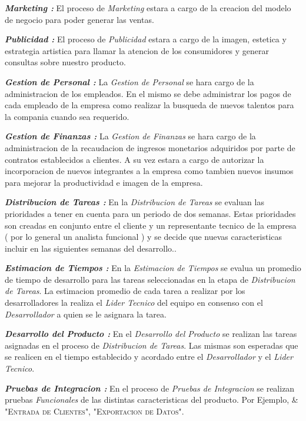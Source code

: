 \documentclass[
10pt, %
a4paper, %
oneside, %
headinclude,footinclude, %
BCOR5mm, %
]{scrartcl}
\begin{document}
  \textbf{ \emph{Marketing : } } El proceso de \textit{Marketing} estara
  a cargo de la creacion del modelo de negocio para poder generar las ventas.

  \textbf{ \emph{Publicidad : } } El proceso de \textit{Publicidad} estara
  a cargo de la imagen, estetica y estrategia artistica para llamar la atencion
  de los consumidores y generar consultas sobre nuestro producto.

  \textbf{ \emph{Gestion de Personal : } } La \textit{Gestion de Personal}
  se hara cargo de la administracion de los empleados. En el mismo se debe
  administrar los pagos de cada empleado de la empresa como realizar la busqueda
  de nuevos talentos para la compania cuando sea requerido.

  \textbf{ \emph{Gestion de Finanzas : } } La \textit{Gestion  de Finanzas} se
   hara cargo de la administracion de la recaudacion de ingresos monetarios
   adquiridos por parte de contratos establecidos a clientes. A su vez
   estara a cargo de autorizar la incorporacion de nuevos integrantes a la
   empresa como tambien nuevos insumos para mejorar la productividad e
   imagen de la empresa.

  \textbf{ \emph{Distribucion de Tareas : } } En la \textit{Distribucion de Tareas}
  se evaluan las prioridades a tener en cuenta para un periodo de dos semanas.
  Estas prioridades son creadas en conjunto entre el cliente y un representante
  tecnico de la empresa ( por lo general un analista funcional ) y se decide
  que nuevas caracteristicas incluir en las siguientes semanas del desarrollo..

  \textbf{ \emph{Estimacion de Tiempos : } } En la \textit{Estimacion de Tiempos}
  se evalua un promedio de tiempo de desarrollo  para las tareas seleccionadas
  en la etapa de \textit{Distribucion de Tareas}. La estimacion promedio de
  cada  tarea a realizar por los desarrolladores la realiza el
  \textit{Lider Tecnico} del equipo en consenso con el \textit{Desarrollador}
  a quien se le asignara la tarea.

  \textbf{ \emph{Desarrollo del Producto : } } En el \textit{Desarrollo del Producto}
  se realizan las tareas asignadas en el proceso de \textit{Distribucion de Tareas}.
  Las mismas son esperadas que se realicen en el tiempo establecido y acordado
  entre el \textit{Desarrollador} y el \textit{Lider Tecnico}.

  \textbf{ \emph{Pruebas de Integracion : } } En el proceso de
  \textit{Pruebas de Integracion} se realizan pruebas \emph{Funcionales} de
  las distintas caracteristicas del producto. Por Ejemplo,
  \newline
  \& "\textsc{Entrada de Clientes}", "\textsc{Exportacion de Datos}".
\end{document}
